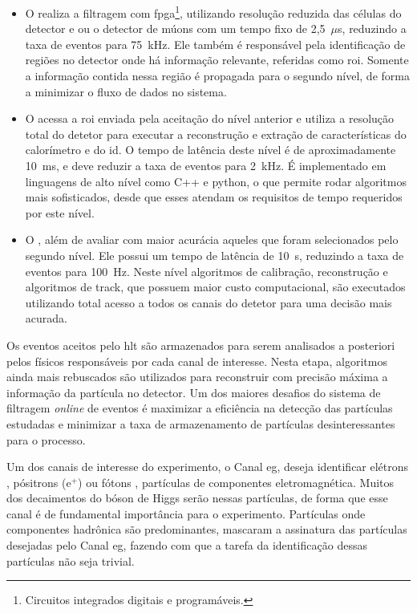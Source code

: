 \begin{itemize}
\item O  realiza a filtragem com
\gls{fpga}\footnote{Circuitos integrados digitais e programáveis.}, 
utilizando resolução reduzida das células do detector e ou o detector de múons
com um tempo fixo de 2,5~$\mu$s, reduzindo a taxa de eventos para
75~kHz. Ele também é responsável pela identificação de regiões no detector onde
há informação relevante, referidas como \gls{roi}. Somente a
informação contida nessa região é propagada para o segundo nível, de forma a
minimizar o fluxo de dados no sistema.

\item O  
acessa a \gls{roi} enviada pela aceitação do nível anterior e utiliza
a resolução total do detetor para executar a reconstrução e extração
de características do calorímetro e do  \gls{id}. O tempo de latência deste nível é de aproximadamente
10~ms, e deve reduzir a taxa de eventos para 2~kHz. É implementado em linguagens de alto
nível como C++ e python, o que permite rodar algoritmos mais sofisticados, desde que esses atendam
os requisitos de tempo requeridos por este nível.

\item O , além de avaliar com maior acurácia aqueles que foram
selecionados pelo segundo nível. Ele possui um tempo de  latência de 10~s, reduzindo a 
taxa de eventos para 100~Hz. Neste nível algoritmos de calibração, reconstrução e algoritmos de track, que possuem 
maior custo computacional, são executados utilizando total acesso a todos os canais do detetor para uma decisão mais acurada.

\end{itemize}

Os eventos aceitos pelo \gls{hlt} são armazenados para serem analisados a posteriori pelos físicos
responsáveis por cada canal de interesse. Nesta etapa, algoritmos ainda mais rebuscados são utilizados
para reconstruir com precisão máxima a informação da partícula no detector. Um dos maiores desafios
do sistema de filtragem \textit{online} de eventos é maximizar a eficiência na detecção das partículas estudadas
e minimizar a taxa de armazenamento de partículas desinteressantes para o processo. 

Um dos canais de interesse do experimento, o Canal \acrshort{eg}, deseja identificar elétrons , 
pósitrons (e$^+$) ou fótons , partículas de componentes eletromagnética. 
Muitos dos decaimentos do bóson de Higgs serão nessas partículas, de forma que esse canal é de fundamental 
importância para o experimento. Partículas onde componentes hadrônica são predominantes, mascaram a 
assinatura das partículas desejadas pelo Canal \acrshort{eg}, fazendo com que a tarefa da identificação dessas 
partículas não seja trivial.

